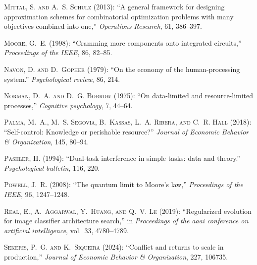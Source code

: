 \begin{thebibliography}{1}
\textsc{Mittal, S. and A.~S. Schulz} (2013): \enquote{A general framework for designing approximation schemes for combinatorial optimization problems with many objectives combined into one,} \emph{Operations Research}, 61, 386--397.

\textsc{Moore, G.~E.} (1998): \enquote{Cramming more components onto integrated circuits,} \emph{Proceedings of the IEEE}, 86, 82--85.

\textsc{Navon, D. and D.~Gopher} (1979): \enquote{On the economy of the human-processing system.} \emph{Psychological review}, 86, 214.

\textsc{Norman, D.~A. and D.~G. Bobrow} (1975): \enquote{On data-limited and resource-limited processes,} \emph{Cognitive psychology}, 7, 44--64.

\textsc{Palma, M.~A., M.~S. Segovia, B.~Kassas, L.~A. Ribera, and C.~R. Hall} (2018): \enquote{Self-control: Knowledge or perishable resource?} \emph{Journal of Economic Behavior \& Organization}, 145, 80--94.

\textsc{Pashler, H.} (1994): \enquote{Dual-task interference in simple tasks: data and theory.} \emph{Psychological bulletin}, 116, 220.

\textsc{Powell, J.~R.} (2008): \enquote{The quantum limit to Moore's law,} \emph{Proceedings of the IEEE}, 96, 1247--1248.

\textsc{Real, E., A.~Aggarwal, Y.~Huang, and Q.~V. Le} (2019): \enquote{Regularized evolution for image classifier architecture search,} in \emph{Proceedings of the aaai conference on artificial intelligence}, vol.~33, 4780--4789.

\textsc{Sekeris, P.~G. and K.~Siqueira} (2024): \enquote{Conflict and returns to scale in production,} \emph{Journal of Economic Behavior \& Organization}, 227, 106735.


\end{thebibliography}

